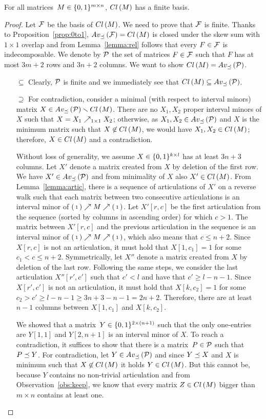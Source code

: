 \begin{thm}
For all matrices~$M\in\{0,1\}^{m\times n}$, $Cl\left(M\right)$ has a finite basis.
\end{thm}
\begin{proof}
Let $\mathcal{F}$ be the basis of $Cl\left(M\right)$. We need to prove that $\mathcal{F}$ is finite. Thanks to Proposition~\ref{prop:0to1}, $Av_{\preceq}\left(\mathcal{F}\right)=Cl\left(M\right)$ is closed under the skew sum with $1\times1$ overlap and from Lemma~\ref{lemma:rel} follows that every $F\in\mathcal{F}$ is indecomposable. We denote by $\mathcal{P}$ the set of matrices $F\in\mathcal{F}$ such that $F$ has at most $3m+2$ rows and $3n+2$ columns. We want to show $Cl\left(M\right)=Av_{\preceq}\left(\mathcal{P}\right)$.
\begin{itemize}
	\item[$\subseteq$] Clearly, $\mathcal{P}$ is finite and we immediately see that $Cl\left(M\right)\subseteq Av_{\preceq}\left(\mathcal{P}\right)$.
	\item[$\supseteq$] For contradiction, consider a minimal (with respect to interval minors) matrix $X\in Av_{\preceq}\left(\mathcal{P}\right)\smallsetminus Cl\left(M\right)$. There are no $X_1,X_2$ proper interval minors of $X$ such that $X=X_1\nearrow_{1\times1}X_2$; otherwise, as $X_1,X_2\in Av_{\preceq}\left(\mathcal{P}\right)$ and $X$ is the minimum matrix such that $X\not\in Cl\left(M\right)$, we would have $X_1,X_2\in Cl\left(M\right)$; therefore, $X\in Cl\left(M\right)$ and a contradiction.

Without loss of generality, we assume $X\in\{0,1\}^{k\times l}$ has at least $3n+3$ columns. Let $X'$ denote a matrix created from $X$ by deletion of the first row. We have $X'\in Av_{\preceq}\left(\mathcal{P}\right)$ and from minimality of $X$ also $X'\in Cl\left(M\right)$. From Lemma~\ref{lemma:artic}, there is a sequence of articulations of $X'$ on a reverse walk such that each matrix between two consecutive articulations is an interval minor of $\left(\begin{smallmatrix}1\end{smallmatrix}\right)\nearrow M\nearrow\left(\begin{smallmatrix}1\end{smallmatrix}\right)$. Let $X'[r,c]$ be the first articulation from the sequence (sorted by columns in ascending order) for which $c>1$. The matrix between $X'[r,c]$ and the previous articulation in the sequence is an interval minor of $\left(\begin{smallmatrix}1\end{smallmatrix}\right)\nearrow M\nearrow\left(\begin{smallmatrix}1\end{smallmatrix}\right)$, which also means that $c\leq n+2$. Since $X[r,c]$ is not an articulation, it must hold that $X[1,c_1]=1$ for some $c_1<c\leq n+2$. Symmetrically, let $X''$ denote a matrix created from $X$ by deletion of the last row. Following the same steps, we consider the last articulation $X''[r',c']$ such that $c'<l$ and have that $c'\geq l-n-1$. Since $X[r',c']$ is not an articulation, it must hold that $X[k,c_2]=1$ for some $c_2>c'\geq l-n-1\geq 3n+3-n-1=2n+2$. Therefore, there are at least $n-1$ columns between $X[1,c_1]$ and $X[k,c_2]$.

We showed that a matrix~$Y\in\{0,1\}^{2\times(n+1)}$ such that the only one-entries are $Y[1,1]$ and $Y[2,n+1]$ is an interval minor of $X$. To reach a contradiction, it suffices to show that there is a matrix~$P\in\mathcal{P}$ such that $P\preceq Y$. For contradiction, let $Y\in Av_{\preceq}\left(\mathcal{P}\right)$ and since $Y\preceq X$ and $X$ is minimum such that $X\not\in Cl\left(M\right)$ it holds $Y\in Cl\left(M\right)$. But this cannot be, because $Y$ contains no non-trivial articulation and from Observation~\ref{obs:keep}, we know that every matrix $Z\in Cl\left(M\right)$ bigger than $m\times n$ contains at least one. \qedhere
\end{itemize}
\end{proof}

